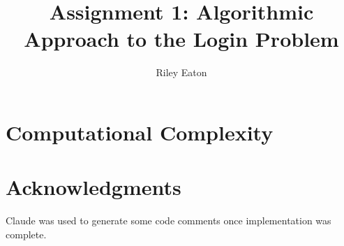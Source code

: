 \documentclass[acmsmall,screen]{acmart}
\title{Assignment 1: Algorithmic Approach to the Login Problem}
\author{Riley Eaton}
\affiliation{%
  \institution{University of British Columbia}
  \city{Kelowna}
  \state{BC}
  \country{Canada}
}
\begin{document}
\maketitle

\section{Computational Complexity} \label{sec:complexity}





\section*{Acknowledgments}
Claude was used to generate some code comments once implementation was complete.
\end{document}
